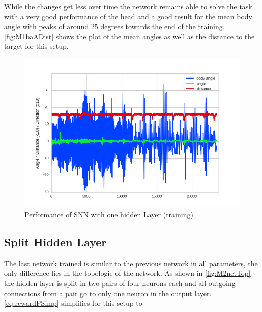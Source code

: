 While the changes get less over time the network remains able to solve the task with a very good performance of the head and a good result for the mean body angle with peaks of around $25$ degrees towards the end of the training. \autoref{fig:M1baADist} shows the plot of the mean angles as well as the distance to the target for this setup.
\begin{figure}[htpb]
  \centering
  \includegraphics[width=\textwidth]{figures/plots/newPlots/m1train_perf}%
  \caption{ Performance of SNN with one hidden Layer (training)  }
  \label{fig:M1baADist}
\end{figure}
\subsection{Split Hidden Layer}
The last network trained is similar to the previous network in all parameters, the only difference lies in the topologie of the network. As shown in \autoref{fig:M2netTop} the hidden layer is split in two pairs of four neurons each and all outgoing connections from a pair go to only one neuron in the output layer. \autoref{eq:rewardPSimp} simplifies for this setup to

